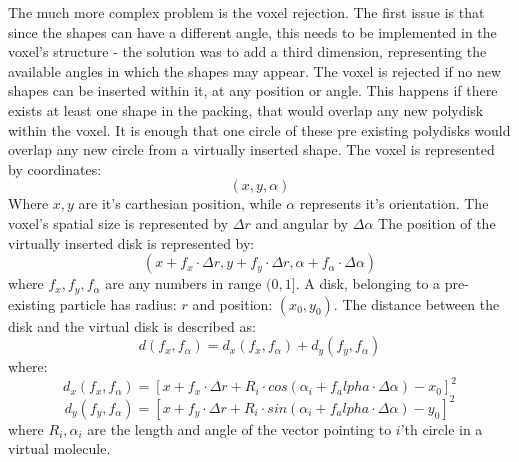 \documentclass[12pt, oneside]{report}
\begin{document}
The much more complex problem is the voxel rejection. The first issue is that since the shapes can have a different angle, this needs to be implemented in the voxel's structure - the solution was to add a third dimension, representing the available angles in which the shapes may appear. \newline \newline
The voxel is rejected if no new shapes can be inserted within it, at any position or angle. This happens if there exists at least one shape in the packing, that would overlap any new polydisk within the voxel. It is enough that one circle of these pre existing polydisks would overlap any new circle from a virtually inserted shape.\newline
The voxel is represented by coordinates:
\begin{equation*}
(x,y,\alpha)
\end{equation*}
Where $x,y$ are it's carthesian position, while $\alpha$ represents it's orientation. \newline
The voxel's spatial size is represented by $\Delta r$ and angular by $\Delta \alpha$ \newline
The position of the virtually inserted disk is represented by:
\begin{equation*}
(x+f_x \cdot \Delta r, y + f_y \cdot \Delta r, \alpha + f_{\alpha} \cdot \Delta \alpha)
\end{equation*}
where $f_x,f_y,f_{\alpha}$ are any numbers in range $(0,1]$. \newline
A disk, belonging to a pre-existing particle has radius: $r$ and position: $(x_0,y_0)$. The distance between the disk and the virtual disk is described as: \newline
\begin{equation*}
d(f_x,f_{\alpha})=d_x(f_x,f_{\alpha})+d_y(f_y,f_{\alpha})
\end{equation*}
where: \newline
\begin{equation*}
d_x(f_x,f_{\alpha})=[x+f_x \cdot \Delta r + R_i \cdot cos(\alpha_i+f_alpha \cdot \Delta \alpha)-x_0]^2
\end{equation*}
\begin{equation*}
d_y(f_y,f_{\alpha})=[x+f_y \cdot \Delta r + R_i \cdot sin(\alpha_i+f_alpha \cdot \Delta \alpha)-y_0]^2
\end{equation*}
where $R_i, \alpha_i$ are the length and angle of the vector pointing to $i$'th circle in a virtual molecule. \newline
\end{document}
